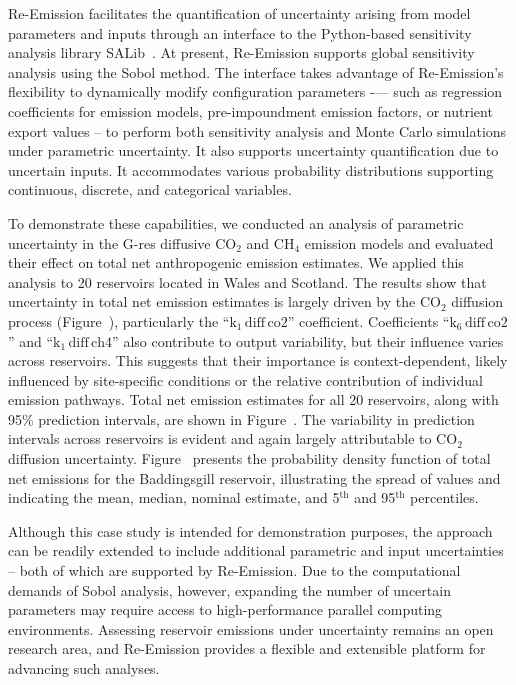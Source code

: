 \documentclass[final,1p,times]{elsarticle}
\begin{document}
Re-Emission facilitates the quantification of uncertainty arising from model parameters and inputs through an interface to the Python-based sensitivity analysis library SALib~\cite{Iwanaga_Toward_SALib_2_0_2022}.
At present, Re-Emission supports global sensitivity analysis using the Sobol method.
The interface takes advantage of Re-Emission’s flexibility to dynamically modify configuration parameters -— such as regression coefficients for emission models, pre-impoundment emission factors, or nutrient export values -- to perform both sensitivity analysis and Monte Carlo simulations under parametric uncertainty.
It also supports uncertainty quantification due to uncertain inputs.
It accommodates various probability distributions supporting continuous, discrete, and categorical variables.

To demonstrate these capabilities, we conducted an analysis of parametric uncertainty in the G-res diffusive CO$_2$ and CH$_4$ emission models and evaluated their effect on total net anthropogenic emission estimates. 
We applied this analysis to 20 reservoirs located in Wales and Scotland. 
The results show that uncertainty in total net emission estimates is largely driven by the CO$_2$ diffusion process (Figure~), particularly the ``$\textrm{k}_1\,\textrm{diff}\,\textrm{co2}$'' coefficient. Coefficients ``$\textrm{k}_6\,\textrm{diff}\,\textrm{co2}$'' and ``$\textrm{k}_1\,\textrm{diff}\,\textrm{ch4}$'' also contribute to output variability, but their influence varies across reservoirs. This suggests that their importance is context-dependent, likely influenced by site-specific conditions or the relative contribution of individual emission pathways. 
Total net emission estimates for all 20 reservoirs, along with 95\% prediction intervals, are shown in Figure~.
The variability in prediction intervals across reservoirs is evident and again largely attributable to CO$_2$ diffusion uncertainty.
Figure~ presents the probability density function of total net emissions for the Baddingsgill reservoir, illustrating the spread of values and indicating the mean, median, nominal estimate, and 5$^\textrm{th}$ and 95$^\textrm{th}$ percentiles.

Although this case study is intended for demonstration purposes, the approach can be readily extended to include additional parametric and input uncertainties -- both of which are supported by Re-Emission.
Due to the computational demands of Sobol analysis, however, expanding the number of uncertain parameters may require access to high-performance parallel computing environments.
Assessing reservoir emissions under uncertainty remains an open research area, and Re-Emission provides a flexible and extensible platform for advancing such analyses.
\end{document}
